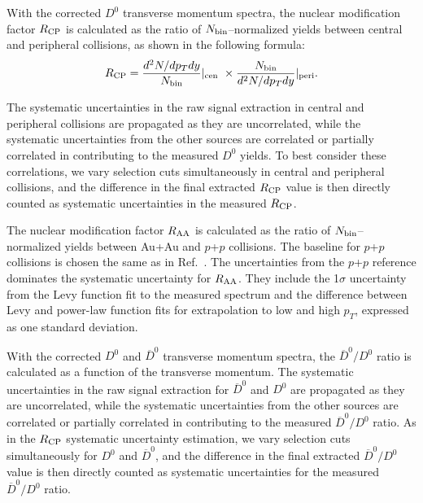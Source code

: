 \documentclass[%
 reprint,	
showpacs,
 amsmath,amssymb,
 aps,
 prc,
]{revtex4-1}
\begin{document}
With the corrected $D^0$ transverse momentum spectra, the nuclear modification factor $R_{\rm CP}$ is calculated as the ratio of $N_{\rm bin}$--normalized yields between central and peripheral collisions, as shown in the following formula:
\begin{equation}
  R_{\rm CP} = \frac{d^2N/dp_{T}dy}{N_{\rm bin}} |_{\rm cen\ } \times \frac{N_{\rm bin}} {d^2N/dp_{T}dy} |_{\rm peri }.
\label{equ:equation3}
\end{equation}

The systematic uncertainties in the raw signal extraction in central and peripheral collisions are propagated as they are uncorrelated, while the systematic uncertainties from the other sources are correlated or partially correlated in contributing to the measured $D^0$ yields. To best consider these correlations, we vary selection cuts simultaneously in central and peripheral collisions, and the difference in the final extracted $R_{\rm CP}$ value is then directly counted as systematic uncertainties in the measured $R_{\rm CP}$.

The nuclear modification factor $R_{\rm AA}$ is calculated as the ratio of $N_{\rm bin}$--normalized yields between Au+Au and $p$+$p$ collisions. The baseline for $p$+$p$ collisions is chosen the same as in Ref.~\cite{Star_D_RAA}. The uncertainties from the $p$+$p$ reference dominates the systematic uncertainty for $R_{\rm AA}$. They include the 1$\sigma$ uncertainty from the Levy function fit to the measured spectrum and the difference between Levy and power-law function fits for extrapolation to low and high $p_T$, expressed as one standard deviation.

With the corrected $D^0$ and $\overline{D}^{0}$ transverse momentum spectra, the $\overline{D}^{0}/D^0$ ratio is calculated as a function of the transverse momentum. The systematic uncertainties in the raw signal extraction for $\overline{D}^{0}$ and $D^0$ are propagated as they are uncorrelated, while the systematic uncertainties from the other sources are correlated or partially correlated in contributing to the measured $\overline{D}^{0}/D^0$ ratio. As in the $R_{\rm CP}$ systematic uncertainty estimation, we vary selection cuts simultaneously for $D^0$ and $\overline{D}^{0}$, and the difference in the final extracted $\overline{D}^{0}/D^0$ value is then directly counted as systematic uncertainties for the measured $\overline{D}^{0}/D^0$ ratio.
\end{document}
